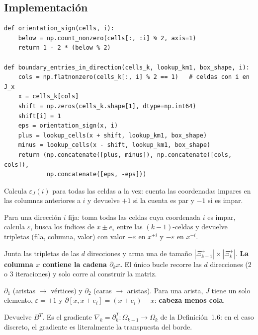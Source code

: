 \documentclass[11pt,a4paper]{article}
\theoremstyle{plain}
\theoremstyle{remark}
\newcommand{\fn}[1]{\texttt{\detokenize{#1}}}
\begin{document}
\subsection{Implementación}

\begin{lstlisting}
def orientation_sign(cells, i):
    below = np.count_nonzero(cells[:, :i] % 2, axis=1)
    return 1 - 2 * (below % 2)

def boundary_entries_in_direction(cells_k, lookup_km1, box_shape, i):
    cols = np.flatnonzero(cells_k[:, i] % 2 == 1)   # celdas con i en J_x
    x = cells_k[cols]
    shift = np.zeros(cells_k.shape[1], dtype=np.int64)
    shift[i] = 1
    eps = orientation_sign(x, i)
    plus = lookup_cells(x + shift, lookup_km1, box_shape)
    minus = lookup_cells(x - shift, lookup_km1, box_shape)
    return (np.concatenate([plus, minus]), np.concatenate([cols, cols]),
            np.concatenate([eps, -eps]))
\end{lstlisting}

\begin{description}[style=nextline, leftmargin=1.2em, font=\normalfont]
  \item[\fn{orientation_sign(cells, i)}] Calcula $\varepsilon_J(i)$ para todas las celdas a la vez: cuenta las coordenadas impares en las columnas anteriores a $i$ y devuelve $+1$ si la cuenta es par y $-1$ si es impar.
  \item[\fn{boundary_entries_in_direction(...)}] Para una dirección $i$ fija: toma todas las celdas cuya coordenada $i$ es impar, calcula $\varepsilon$, busca los índices de $x\pm e_i$ entre las $(k-1)$-celdas y devuelve tripletas (fila, columna, valor) con valor $+\varepsilon$ en $x^{+i}$ y $-\varepsilon$ en $x^{-i}$.
  \item[\fn{boundary_matrix(cells_k, cells_km1, box_shape)}] Junta las tripletas de las $d$ direcciones y arma una \fn{csr_matrix} de tamaño $|\Xi_{k-1}^+|\times|\Xi_k^+|$. \textbf{La columna $x$ contiene la cadena $\partial_k x$.} El único bucle recorre las $d$ direcciones (2 o 3 iteraciones) y solo corre al construir la matriz.
  \item[\fn{boundary_1}, \fn{boundary_2}] $\partial_1$ (aristas $\to$ vértices) y $\partial_2$ (caras $\to$ aristas). Para una arista, $J$ tiene un solo elemento, $\varepsilon=+1$ y $\partial[x,x+e_i]=(x+e_i)-x$: \textbf{cabeza menos cola}.
  \item[\fn{coboundary_matrix(B)}] Devuelve $B^T$. Es el gradiente $\nabla_k=\partial_k^T:\Omega_{k-1}\to\Omega_k$ de la Definición~1.6: en el caso discreto, el gradiente es literalmente la transpuesta del borde.
\end{description}
\end{document}
